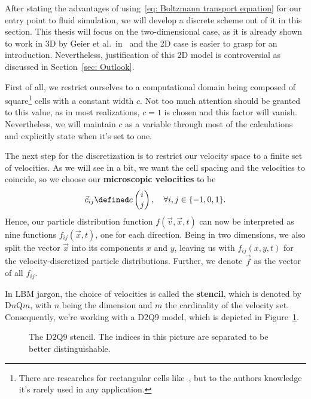 After stating the advantages of using~\eqref{eq: Boltzmann transport equation} for our entry point to fluid simulation, we will develop a discrete scheme out of it in this section.
This thesis will focus on the two-dimensional case, as it is already shown to work in 3D by Geier et al.\ in~\cite{geier2015cumulant} and the 2D case is easier to grasp for an introduction. Nevertheless, justification of this 2D model is controversial as discussed in Section~\ref{sec: Outlook}.

First of all, we restrict ourselves to a computational domain being composed of square\footnote{There are researches for rectangular cells like~\cite{Bouzidi2001704}, but to the authors knowledge it's rarely used in any application.} cells with a constant width $c$.
Not too much attention should be granted to this value, as in most realizations, $c=1$ is chosen and this factor will vanish.
Nevertheless, we will maintain $c$ as a variable through most of the calculations and explicitly state when it's set to one.

The next step for the discretization is to restrict our velocity space to a finite set of velocities. As we will see in a bit, we want the cell spacing and the velocities to coincide, so we choose our \textbf{microscopic velocities} to be
\begin{equation}
  \label{eq: definition of the velocities}
  \vec{c}_{ij} \defined c\begin{pmatrix}i \\ j\end{pmatrix}, \quad\forall i,j\in \{-1, 0, 1\}.
\end{equation}
Hence, our particle distribution function $f(\vec{v},\vec{x},t)$ can now be interpreted as nine functions $f_{ij}(\vec{x},t)$, one for each direction.
Being in two dimensions, we also split the vector $\vec{x}$ into its components $x$ and $y$, leaving us with $f_{ij}(x,y,t)$ for the velocity-discretized particle distributions.
Further, we denote $\vec{f}$ as the vector of all $f_{ij}$.

In LBM jargon, the choice of velocities is called the \textbf{stencil}, which is denoted by D$n$Q$m$, with $n$ being the dimension and $m$ the cardinality of the velocity set.
Consequently, we're working with a D2Q9 model, which is depicted in Figure~\ref{fig: D2Q9 stencil}.

\begin{figure}
  \centering
  
\caption{The D$2$Q$9$ stencil. The indices in this picture are separated to be better distinguishable.}
\label{fig: D2Q9 stencil}
\end{figure}

